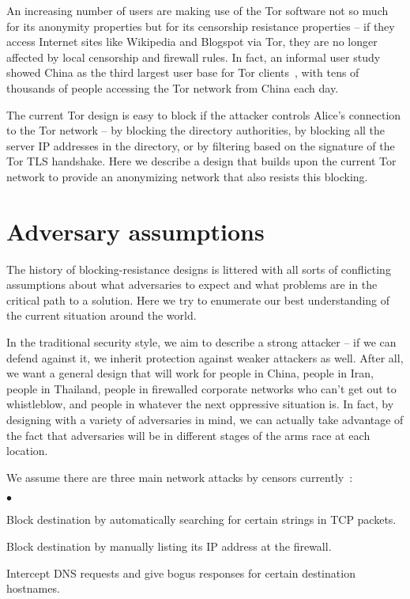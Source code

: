 \documentclass{llncs}
\newenvironment{tightlist}{\begin{list}{$\bullet$}{
  \setlength{\itemsep}{0mm}
    \setlength{\parsep}{0mm}
    }}{\end{list}}
\begin{document}
An increasing number of users are making use of the Tor software not
so much for its anonymity properties but for its censorship resistance
properties -- if they access Internet sites like Wikipedia and Blogspot
via Tor, they are no longer affected by local censorship and firewall
rules. In fact, an informal user study showed China as the third largest
user base for Tor clients~\cite{geoip-tor}, with tens of thousands of
people accessing the Tor network from China each day.

The current Tor design is easy to block if the attacker controls Alice's
connection to the Tor network -- by blocking the directory authorities,
by blocking all the server IP addresses in the directory, or by filtering
based on the signature of the Tor TLS handshake. Here we describe a
design that builds upon the current Tor network to provide an anonymizing
network that also resists this blocking.


\section{Adversary assumptions}
\label{sec:adversary}

The history of blocking-resistance designs is littered with all sorts
of conflicting assumptions about what adversaries to expect and what
problems are in the critical path to a solution. Here we try to enumerate
our best understanding of the current situation around the world.

In the traditional security style, we aim to describe a strong attacker
-- if we can defend against it, we inherit protection against weaker
attackers as well. After all, we want a general design that will
work for people in China, people in Iran, people in Thailand, people
in firewalled corporate networks who can't get out to whistleblow,
and people in whatever the next oppressive situation is. In fact, by
designing with a variety of adversaries in mind, we can actually take
advantage of the fact that adversaries will be in different stages of
the arms race at each location.

We assume there are three main network attacks by censors
currently~\cite{clayton:pet2006}:

\begin{tightlist}
\item Block destination by automatically searching for certain strings
in TCP packets.
\item Block destination by manually listing its IP address at the
firewall.
\item Intercept DNS requests and give bogus responses for certain
destination hostnames.
\end{tightlist}
\end{document}
